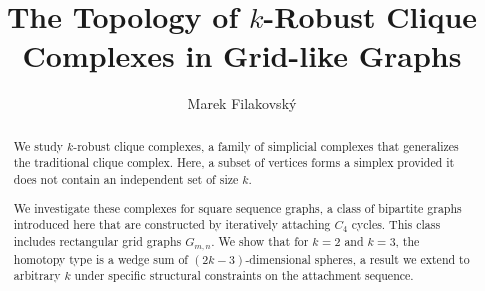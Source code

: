 \documentclass[a4paper, v2021]{lipics-v2021}
\title{The Topology of $k$-Robust Clique Complexes in Grid-like Graphs} %
\author{Marek {Filakovský}}{Faculty of Sceince, Masaryk University, Kotlářská 267/2, 611 37 Brno, Czech Republic}{filakovsky@math.muni.cz}{https://orcid.org/0000-0001-5978-2623}{The work of the author was supported by the OP JAK Project MSCAFellow5\_MUNI (CZ.02.01.01/00/22\_010/0003229) and Masaryk University grant MUNI/SC/1957/2024 (GAMU MASH StG/CoG).}
\theoremstyle{plain}
\theoremstyle{definition}
\begin{document}
\maketitle

\begin{abstract}





We study $k$-robust clique complexes, a family of simplicial complexes that generalizes the traditional clique complex. Here, a subset of vertices forms a simplex provided it does not contain an independent set of size $k$.

We investigate these complexes for square sequence graphs, a class of bipartite graphs introduced here that are constructed by iteratively attaching $C_4$ cycles. This class includes rectangular grid graphs $G_{m,n}$. We show that for $k=2$ and $k=3$, the homotopy type is a wedge sum of $(2k-3)$-dimensional spheres, a result we extend to arbitrary $k$ under specific structural constraints on the attachment sequence.


\end{abstract}
\end{document}
